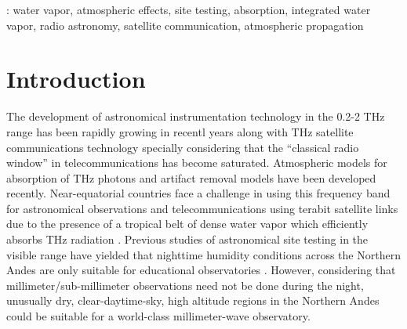\documentclass[12pt]{iopart}
\begin{document}
%
: water vapor, atmospheric effects, site testing, absorption, integrated water vapor, radio astronomy, satellite communication, atmospheric propagation\\
%
%
% 
%


\section{Introduction}

The development of astronomical instrumentation technology in the 0.2-2 THz range has been rapidly growing in recentl years along with THz satellite communications technology \cite{newera} specially considering that the ``classical radio window'' in telecommunications has become saturated. Atmospheric models for absorption of THz photons \cite{rosenkranz,lababs} and artifact removal models \cite{removal} have been developed recently. Near-equatorial countries face a challenge in using this frequency band for astronomical observations and telecommunications using terabit satellite links  \cite{suen2016} due to the presence of a tropical belt of dense water vapor which efficiently absorbs THz radiation \cite{tropicalbelt}. Previous studies of astronomical site testing in the visible range have yielded that nighttime humidity conditions across the Northern Andes are only suitable for educational observatories \cite{pinzon}. However, considering that millimeter/sub-millimeter observations need not be done during the night, unusually dry, clear-daytime-sky, high altitude regions in the Northern Andes could be suitable for a world-class millimeter-wave observatory. \\
\end{document}
